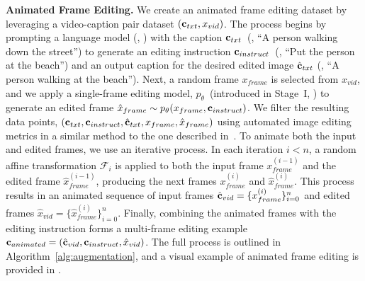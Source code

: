 \textbf{Animated Frame Editing.}
We create an animated frame editing dataset by leveraging a video-caption pair dataset  $(\mathbf{c}_{txt}, x_{vid})$.
The process begins by prompting a language model (\eg, \llama) with the caption  $\mathbf{c}_{txt}$~(\eg, ``A person walking down the street'') to generate an editing instruction $\mathbf{c}_{instruct}$~(\eg, ``Put the person at the beach'') and an output caption for the desired edited image $\hat{\mathbf{c}}_{txt}$ (\eg, ``A person walking at the beach'').
Next, a random frame  $x_{frame}$  is selected from  $x_{vid}$, and we apply a single-frame editing model, $p_\theta$~(introduced in Stage~I, ) to generate an edited frame $\hat{x}_{frame} \sim p_\theta(x_{frame}, \mathbf{c}_{instruct})$.
We filter the resulting data points, $(\mathbf{c}_{txt}, \mathbf{c}_{instruct}, \hat{\mathbf{c}}_{txt}, x_{frame}, \hat{x}_{frame})$ using automated image editing metrics in a similar method to the one described in~\citep{emuedit}.
To animate both the input and edited frames, we use an iterative process.
In each iteration $i<n$, a random affine transformation $\mathcal{F}_i$ is applied to both the input frame $x_{frame}^{(i-1)}$ and the edited frame $\hat{x}_{frame}^{(i-1)}$, producing the next frames $x_{frame}^{(i)}$ and $\hat{x}_{frame}^{(i)}$.
This process results in an animated sequence of input frames $\hat{\mathbf{c}}_{vid} = \{x_{frame}^{(i)}\}_{i=0}^n$ and edited frames $\hat{x}_{vid} = \{\hat{x}_{frame}^{(i)}\}_{i=0}^n$.
Finally, combining the animated frames with the editing instruction forms a multi-frame editing example $\mathbf{c}_{animated}=(\hat{\mathbf{c}}_{vid}, \mathbf{c}_{instruct}, \hat{x}_{vid})$.
The full process is outlined in Algorithm~\ref{alg:augmentation}, and a visual example of animated frame editing is provided in .
